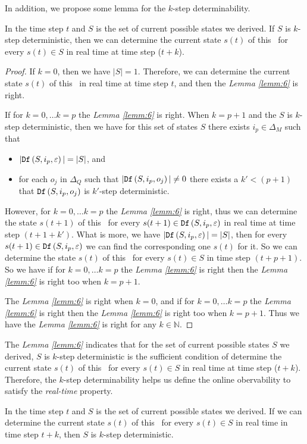 In addition, we propose some lemma for the $k$-step determinability.
\begin{lemma}
 In the time step $t$ and $S$ is the set of current possible states we derived. If $S$ is $k$-step deterministic, then we can determine the current state $s(t)$ of this \BCN\ for every $s(t)\in S$ in real time at time step ($t+k$).
  \label{lemm:6}
\end{lemma}
\begin{proof} If $k=0$, then we have $|S|=1$. Therefore, we can determine the current state $s(t)$ of this \BCN\ in real time at time step $t$, and then the {\em Lemma \ref{lemm:6}} is right. 

If for $k=0,\ldots k=p$ the {\em Lemma \ref{lemm:6}} is right. When $k=p+1$ and the $S$ is $k$-step deterministic, then we have for this set of states $S$ there exists $i_p \in \Delta_M$ such that
 \begin{itemize}
 \item  $|{\tt Df}\left(S,i_p,\varepsilon\right)|=|S|$, and 
 \item  for each $o_j$ in $\Delta_Q$ such that $|{\tt Df}\left(S,i_p,o_j\right)|\neq 0$ there exists a ${k'}<(p+1)$ that ${\tt Df}\left(S,i_p,o_j\right)$ is $k'$-step deterministic.
 \end{itemize}
 However, for $k=0,\ldots k=p$ the {\em Lemma \ref{lemm:6}} is right, thus we can determine the state $s(t+1)$ of this \BCN\ for every $s(t+1)\in {\tt Df}\left(S,i_p,\varepsilon\right)$ in real time at time step $(t+1+k')$. What is more, we have $|{\tt Df}\left(S,i_p,\varepsilon\right)|=|S|$, then for every $s(t+1)\in {\tt Df}\left(S,i_p,\varepsilon\right)$ we can find the corresponding one $s(t)$ for it. So we can determine the state $s(t)$ of this \BCN\ for every $s(t)\in S$ in time step $(t+p+1)$. So we have if for $k=0,\ldots k=p$ the {\em Lemma \ref{lemm:6}} is right then the {\em Lemma \ref{lemm:6}} is right too when $k=p+1$. 
 
The {\em Lemma \ref{lemm:6}} is right when $k=0$, and if for $k=0,\ldots k=p$ the {\em Lemma \ref{lemm:6}} is right then the {\em Lemma \ref{lemm:6}} is right too when $k=p+1$. Thus we have the {\em Lemma \ref{lemm:6}} is right for any $k\in \mathbb{N}$.
\end{proof}

The {\em Lemma \ref{lemm:6}} indicates that for the set of current possible states $S$ we derived, $S$ is $k$-step deterministic is the sufficient condition of determine the current state $s(t)$ of this \BCN\ for every $s(t)\in S$ in real time at time step ($t+k$). Therefore, the $k$-step determinability helps us define the online obervability to satisfy the {\em real-time} property. 
\begin{lemma}
 In the time step $t$ and $S$ is the set of current possible states we derived. If we can determine the current state $s(t)$ of this \BCN\ for every $s(t)\in S$ in real time in time step $t+k$, then $S$ is $k$-step deterministic. 
  \label{lemm:7}
\end{lemma}

